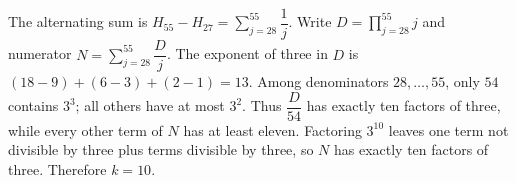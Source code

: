 The alternating sum is $H_{55}-H_{27}=\sum_{j=28}^{55}\dfrac{1}{j}$. Write $D=\prod_{j=28}^{55}j$ and numerator $N=\sum_{j=28}^{55}\dfrac{D}{j}$. The exponent of three in $D$ is $(18-9)+(6-3)+(2-1)=13$. Among denominators $28,\ldots,55$, only $54$ contains $3^3$; all others have at most $3^2$. Thus $\dfrac{D}{54}$ has exactly ten factors of three, while every other term of $N$ has at least eleven. Factoring $3^{10}$ leaves one term not divisible by three plus terms divisible by three, so $N$ has exactly ten factors of three. Therefore $\boxed{k=10}$.
